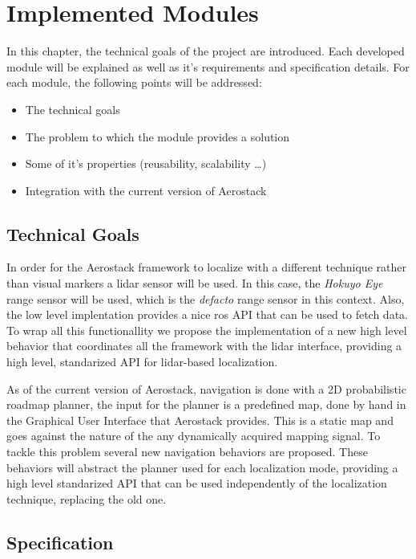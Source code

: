 \chapter{Implemented Modules}

In this chapter, the technical goals of the project are introduced. Each developed module will be explained as well as it's requirements and specification details. For each module, the following points will be addressed:

\begin{itemize}
  \item The technical goals
  \item The problem to which the module provides a solution
  \item Some of it's properties (reusability, scalability \dots)
  \item Integration with the current version of Aerostack
\end{itemize}

\section{Technical Goals}

  In order for the Aerostack framework to localize with a different technique rather than visual markers a lidar sensor will be used. In this case, the \textit{Hokuyo Eye} range sensor will be used, which is the \textit{defacto} range sensor in this context. Also, the low level implentation provides a nice ros API that can be used to fetch data. To wrap all this functionallity we propose the implementation of a new high level behavior that coordinates all the framework with the lidar interface, providing a high level, standarized API for lidar-based localization.

  As of the current version of Aerostack, navigation is done with a 2D probabilistic roadmap planner, the input for the planner is a predefined map, done by hand in the Graphical User Interface that Aerostack provides. This is a static map and goes against the nature of the any dynamically acquired mapping signal. To tackle this problem several new navigation behaviors are proposed. These behaviors will abstract the planner used for each localization mode, providing a high level standarized API that can be used independently of the localization technique, replacing the old one.

\section{Specification}

